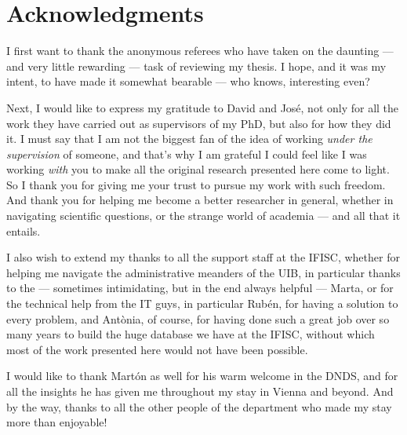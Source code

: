 \documentclass[../thesis.tex]{subfiles}
\begin{document}

\begingroup
\let\clearpage\relax
\let\cleardoublepage\relax
\let\cleardoublepage\relax
\chapter*{Acknowledgments}

I first want to thank the anonymous referees who have taken on the daunting --- and very little rewarding --- task of reviewing my thesis.
I hope, and it was my intent, to have made it somewhat bearable --- who knows, interesting even?

Next, I would like to express my gratitude to David and José, not only for all the work they have carried out as supervisors of my PhD, but also for how they did it.
I must say that I am not the biggest fan of the idea of working \emph{under the supervision} of someone, and that's why I am grateful I could feel like I was working \emph{with} you to make all the original research presented here come to light.
So I thank you for giving me your trust to pursue my work with such freedom.
And thank you for helping me become a better researcher in general, whether in navigating scientific questions, or the strange world of academia --- and all that it entails.

I also wish to extend my thanks to all the support staff at the IFISC, whether for helping me navigate the administrative meanders of the UIB, in particular thanks to the --- sometimes intimidating, but in the end always helpful --- Marta, or for the technical help from the IT guys, in particular Rubén, for having a solution to every problem, and Antònia, of course, for having done such a great job over so many years to build the huge database we have at the IFISC, without which most of the work presented here would not have been possible.

I would like to thank Martón as well for his warm welcome in the DNDS, and for all the insights he has given me throughout my stay in Vienna and beyond.
And by the way, thanks to all the other people of the department who made my stay more than enjoyable!

\end{document}
